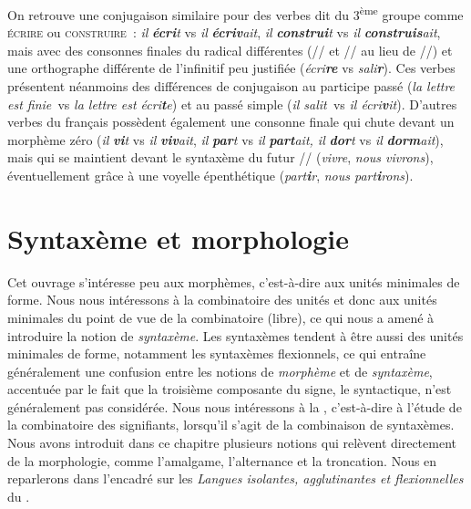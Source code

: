 {    On retrouve une conjugaison similaire pour des verbes dit du 3\textsuperscript{ème} groupe comme \textsc{écrire} ou \textsc{construire~}: \textit{il} \textbf{\textit{écri}}\textit{t} vs \textit{il} \textbf{\textit{écriv}}\textit{ait}, \textit{il} \textbf{\textit{construi}}\textit{t} vs \textit{il} \textbf{\textit{construis}}\textit{ait}, mais avec des consonnes finales du radical différentes (// et // au lieu de //) et une orthographe différente de l’infinitif peu justifiée (\textit{écri}\textbf{\textit{re}} vs \textit{sali}\textbf{\textit{r}}). Ces verbes présentent néanmoins des différences de conjugaison au participe passé (\textit{la lettre est finie~}vs \textit{la lettre est écri}\textbf{\textit{t}}\textit{e}) et au passé simple (\textit{il salit~}vs \textit{il écri}\textbf{\textit{v}}\textit{it}). D’autres verbes du français possèdent également une consonne finale qui chute devant un morphème zéro (\textit{il} \textbf{\textit{vi}}\textit{t} vs \textit{il} \textbf{\textit{viv}}\textit{ait}, \textit{il} \textbf{\textit{par}}\textit{t} vs \textit{il} \textbf{\textit{part}}\textit{ait, il} \textbf{\textit{dor}}\textit{t} vs \textit{il} \textbf{\textit{dorm}}\textit{ait}), mais qui se maintient devant le syntaxème du futur \textstylePhonoApprofondissement{{}-}//\textstylePhonoApprofondissement{{}-} (\textit{vivre}, \textit{nous vivrons}), éventuellement grâce à une voyelle épenthétique (\textit{part}\textbf{\textit{i}}\textit{r}, \textit{nous part}\textbf{\textit{i}}\textit{rons}).
}
\section{Syntaxème et morphologie}\label{sec:2.2.26}

Cet ouvrage s’intéresse peu aux morphèmes, c’est-à-dire aux unités minimales de forme. Nous nous intéressons à la combinatoire des unités et donc aux unités minimales du point de vue de la combinatoire (libre), ce qui nous a amené à introduire la notion de \textit{syntaxème}. Les syntaxèmes tendent à être aussi des unités minimales de forme, notamment les syntaxèmes flexionnels, ce qui entraîne généralement une confusion entre les notions de \textit{morphème} et de \textit{syntaxème}, accentuée par le fait que la troisième composante du signe, le syntactique, n’est généralement pas considérée. Nous nous intéressons à la , c’est-à-dire à l’étude de la combinatoire des signifiants, lorsqu’il s’agit de la combinaison de syntaxèmes. Nous avons introduit dans ce chapitre plusieurs notions qui relèvent directement de la morphologie, comme l’amalgame, l’alternance et la troncation. Nous en reparlerons dans l’encadré sur les \textit{Langues isolantes, agglutinantes et flexionnelles} du .

